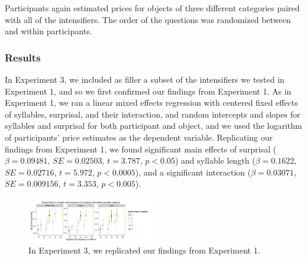 \documentclass[10pt,letterpaper]{article}
\begin{document}
Participants again estimated prices for objects of three different categories paired with all of the intensifiers. The order of the questions was randomized between and within participants.

\subsubsection{Results}
In Experiment 3, we included as filler a subset of the intensifiers we tested in Experiment 1, and so we first confirmed our findings from Experiment 1. As in Experiment 1, we ran a linear mixed effects regression with centered fixed effects of syllables, surprisal, and their interaction, and random intercepts and slopes for syllables and surprisal for both participant and object, and we used the logarithm of participants' price estimates as the dependent variable. Replicating our findings from Experiment 1, we found significant main effects of surprisal ($\beta=0.09481$, $SE=0.02503$, $t=3.787$, $p<0.05$) and syllable length ($\beta=0.1622$, $SE=0.02716$, $t=5.972$, $p<0.0005$), and a significant interaction ($\beta=0.03071$, $SE=0.009156$, $t=3.353$, $p<0.005$).

\begin{figure}[hbt]
\begin{center}
\includegraphics[width=0.5\textwidth]{exp3_replication.pdf}
\end{center}
\caption{In Experiment 3, we replicated our findings from Experiment 1.} 
\label{exp3_replication}
\end{figure}

% 
\end{document}
